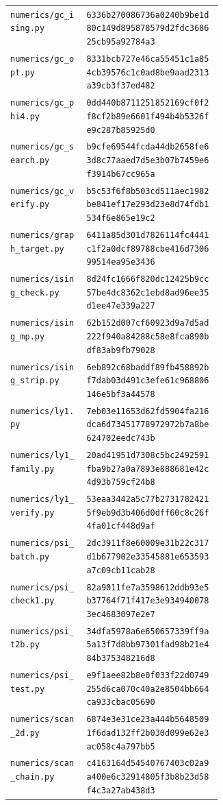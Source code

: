 \documentclass[11pt]{article}
\begin{document}
{\begin{longtable}{@{}p{0.36\linewidth}l@{}}
\texttt{numerics/gc\_ising.py} & \texttt{6336b270086736a0240b9be1d80c149d895878579d2fdc368625cb95a92784a3}\\
\texttt{numerics/gc\_opt.py} & \texttt{8331bcb727e46ca55451c1a854cb39576c1c0ad8be9aad2313a39cb3f37ed482}\\
\texttt{numerics/gc\_phi4.py} & \texttt{0dd440b8711251852169cf0f2f8cf2b89e6601f494b4b5326fe9c287b85925d0}\\
\texttt{numerics/gc\_search.py} & \texttt{b9cfe69544fcda44db2658fe63d8c77aaed7d5e3b07b7459e6f3914b67cc965a}\\
\texttt{numerics/gc\_verify.py} & \texttt{b5c53f6f8b503cd511aec1982be841ef17e293d23e8d74fdb1534f6e865e19c2}\\
\texttt{numerics/graph\_target.py} & \texttt{6411a85d301d7826114fc4441c1f2a0dcf89788cbe416d730699514ea95e3436}\\
\texttt{numerics/ising\_check.py} & \texttt{8d24fc1666f820dc12425b9cc57be4dc8362c1ebd8ad96ee35d1ee47e339a227}\\
\texttt{numerics/ising\_mp.py} & \texttt{62b152d007cf60923d9a7d5ad222f940a84288c58e8fca890bdf83ab9fb79028}\\
\texttt{numerics/ising\_strip.py} & \texttt{6eb892c68baddf89fb458892bf7dab03d491c3efe61c968806146e5bf3a44578}\\
\texttt{numerics/ly1.py} & \texttt{7eb03e11653d62fd5904fa216dca6d73451778972972b7a8be624702eedc743b}\\
\texttt{numerics/ly1\_family.py} & \texttt{20ad41951d7308c5bc2492591fba9b27a0a7893e888681e42c4d93b759cf24b8}\\
\texttt{numerics/ly1\_verify.py} & \texttt{53eaa3442a5c77b27317824215f9eb9d3b406d0dff60c8c26f4fa01cf448d9af}\\
\texttt{numerics/psi\_batch.py} & \texttt{2dc3911f8e60009e31b22c317d1b677902e33545881e653593a7c09cb11cab28}\\
\texttt{numerics/psi\_check1.py} & \texttt{82a9011fe7a3598612ddb93e5b37764f71f417e3e9349400783ec4683097e2e7}\\
\texttt{numerics/psi\_t2b.py} & \texttt{34dfa5978a6e650657339ff9a5a13f7d8bb97301fad98b21e484b375348216d8}\\
\texttt{numerics/psi\_test.py} & \texttt{e9f1aee82b8e0f033f22d0749255d6ca070c40a2e8504bb664ca933cbac05690}\\
\texttt{numerics/scan\_2d.py} & \texttt{6874e3e31ce23a444b56485091f6dad132ff2b030d099e62e3ac058c4a797bb5}\\
\texttt{numerics/scan\_chain.py} & \texttt{c4163164d54540767403c02a9a400e6c32914805f3b8b23d58f4c3a27ab438d3}\\

\end{longtable}}
\end{document}
